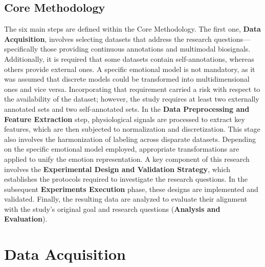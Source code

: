 \documentclass{isd}
\begin{document}
{\subsection{Core Methodology}

The six main steps are defined within the Core Methodology. The first one, \textbf{Data Acquisition}, involves selecting datasets that address the research questions—specifically those providing continuous annotations and multimodal biosignals. Additionally, it is required that some datasets contain self-annotations, whereas others provide external ones. A specific emotional model is not mandatory, as it was assumed that discrete models could be transformed into multidimensional ones and vice versa. Incorporating that requirement carried a risk with respect to the availability of the dataset; however, the study requires at least two externally annotated sets and two self-annotated sets. In the \textbf{Data Preprocessing and Feature Extraction} step, physiological signals are processed to extract key features, which are then subjected to normalization and discretization. This stage also involves the harmonization of labeling across disparate datasets. Depending on the specific emotional model employed, appropriate transformations are applied to unify the emotion representation. A key component of this research involves the \textbf{Experimental Design and Validation Strategy}, which establishes the protocols required to investigate the research questions. In the subsequent \textbf{Experiments Execution} phase, these designs are implemented and validated. Finally, the resulting data are analyzed to evaluate their alignment with the study's original goal and research questions (\textbf{Analysis and Evaluation}).

\section{Data Acquisition}
\label{sec:datasets}

}
\end{document}
